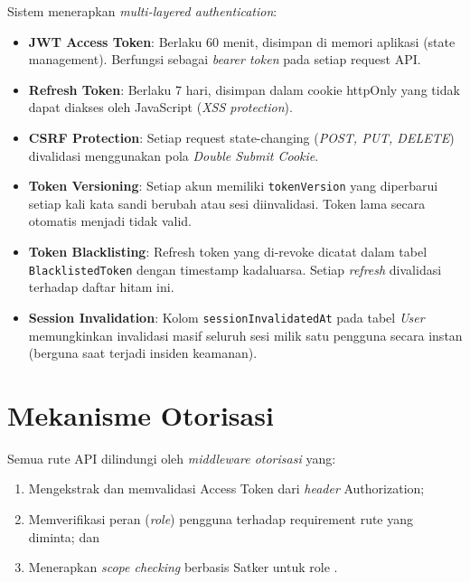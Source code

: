 \documentclass[
  12pt,
  a4paper,
  oneside,
  final
]{report}
\begin{document}
Sistem menerapkan {\it multi-layered authentication}:

\begin{itemize}
  \item {\bfseries JWT Access Token}: Berlaku 60 menit, disimpan
        di memori aplikasi (state management). Berfungsi sebagai
        {\it bearer token} pada setiap request API.

  \item {\bfseries Refresh Token}: Berlaku 7 hari, disimpan dalam
        cookie httpOnly yang tidak dapat diakses oleh JavaScript
        ({\it XSS protection}).

  \item {\bfseries CSRF Protection}: Setiap request state-changing
        ({\it POST, PUT, DELETE}) divalidasi menggunakan pola
        {\it Double Submit Cookie}.

  \item {\bfseries Token Versioning}: Setiap akun memiliki
        \texttt{tokenVersion} yang diperbarui setiap kali
        kata sandi berubah atau sesi diinvalidasi. Token lama
        secara otomatis menjadi tidak valid.

  \item {\bfseries Token Blacklisting}: Refresh token yang di-revoke
        dicatat dalam tabel \texttt{BlacklistedToken} dengan
        timestamp kadaluarsa. Setiap {\it refresh} divalidasi
        terhadap daftar hitam ini.

  \item {\bfseries Session Invalidation}: Kolom
        \texttt{sessionInvalidatedAt} pada tabel {\it User}
        memungkinkan invalidasi masif seluruh sesi milik satu
        pengguna secara instan (berguna saat terjadi insiden
        keamanan).
\end{itemize}

\section{Mekanisme Otorisasi}

Semua rute API dilindungi oleh {\it middleware otorisasi} yang:
\begin{enumerate}
  \item Mengekstrak dan memvalidasi Access Token dari {\it header}
        Authorization;
  \item Memverifikasi peran ({\it role}) pengguna terhadap
        requirement rute yang diminta; dan
  \item Menerapkan {\it scope checking} berbasis Satker untuk
        role {\roleAdmin}.
\end{enumerate}
\end{document}
